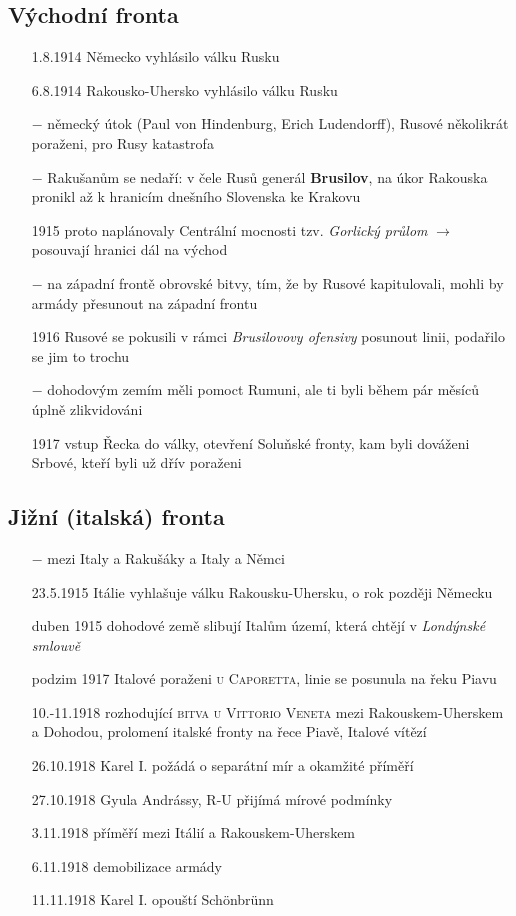 \documentclass{article}
\begin{document}
\subsection*{Východní fronta}
\begin{itemize}
    \vspace{-0.5em}
    \setlength\itemsep{0.15em}
    \item[1.8.1914] Německo vyhlásilo válku Rusku
    \item[6.8.1914] Rakousko-Uhersko vyhlásilo válku Rusku
    \item[$-$] německý útok (Paul von Hindenburg, Erich Ludendorff), Rusové několikrát poraženi, pro Rusy katastrofa
    \item[$-$] Rakušanům se nedaří: v čele Rusů generál \textbf{Brusilov}, na úkor Rakouska pronikl až k hranicím dnešního Slovenska ke Krakovu
    \item[1915] proto naplánovaly Centrální mocnosti tzv. \textit{Gorlický průlom} $\rightarrow$ posouvají hranici dál na východ
    \item[$-$] na západní frontě obrovské bitvy, tím, že by Rusové kapitulovali, mohli by armády přesunout na západní frontu
    \item[1916] Rusové se pokusili v rámci \textit{Brusilovovy ofensivy} posunout linii, podařilo se jim to trochu
    \item[$-$] dohodovým zemím měli pomoct Rumuni, ale ti byli během pár měsíců úplně zlikvidováni
    \item[1917] vstup Řecka do války, otevření Soluňské fronty, kam byli dováženi Srbové, kteří byli už dřív poraženi
\end{itemize}

\subsection*{Jižní (italská) fronta}
\begin{itemize}
    \vspace{-0.5em}
    \setlength\itemsep{0.15em}
    \item[$-$] mezi Italy a Rakušáky a Italy a Němci
    \item[23.5.1915] Itálie vyhlašuje válku Rakousku-Uhersku, o rok později Německu
    \item[duben 1915] dohodové země slibují Italům území, která chtějí v \textit{Londýnské smlouvě}
    \item[podzim 1917] Italové poraženi \textsc{u Caporetta}, linie se posunula na řeku Piavu
    \item[10.-11.1918] rozhodující \textsc{bitva u Vittorio Veneta} mezi Rakouskem-Uherskem a Dohodou, prolomení italské fronty na řece Piavě, Italové vítězí
    \item[26.10.1918] Karel I. požádá o separátní mír a okamžité příměří
    \item[27.10.1918]  Gyula Andrássy, R-U přijímá mírové podmínky
    \item[3.11.1918] příměří mezi Itálií a Rakouskem-Uherskem
    \item[6.11.1918] demobilizace armády
    \item[11.11.1918]  Karel I. opouští Schönbrünn
\end{itemize}
\end{document}

